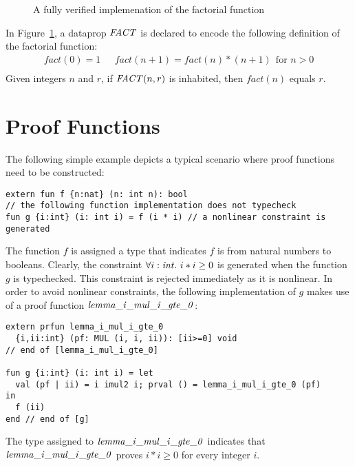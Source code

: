\begin{figure}

\caption{A fully verified implemenation of the factorial function}
\label{figure:factorial_function_proof}
\end{figure}
In Figure~\ref{figure:factorial_function_proof}, a dataprop
${\it FACT}$ is declared to encode the following definition of the factorial
function:
\[\begin{array}{ll}
fact (0) = 1 ~~~& fact (n+1) = fact (n) * (n+1)~~\mbox{for $n>0$} \\
\end{array}\]
Given integers $n$ and $r$, if ${\it FACT}(n,r)$ is inhabited, then
$fact(n)$ equals $r$.

\section{Proof Functions}
The following simple example depicts a typical scenario where
proof functions need to be constructed:
\begin{verbatim}
extern fun f {n:nat} (n: int n): bool
// the following function implementation does not typecheck
fun g {i:int} (i: int i) = f (i * i) // a nonlinear constraint is generated
\end{verbatim}
The function $f$ is assigned a type that indicates $f$ is from natural
numbers to booleans. Clearly, the constraint $\forall{i:{\it int}}.~i*i\geq 0$
is generated when the function $g$ is typechecked. This constraint is
rejected immediately as it is nonlinear. In order to avoid nonlinear
constraints, the following implementation of $g$ makes use of a proof
function ${\it lemma\_i\_mul\_i\_gte\_0}$:
\begin{verbatim}
extern prfun lemma_i_mul_i_gte_0
  {i,ii:int} (pf: MUL (i, i, ii)): [ii>=0] void
// end of [lemma_i_mul_i_gte_0]

fun g {i:int} (i: int i) = let
  val (pf | ii) = i imul2 i; prval () = lemma_i_mul_i_gte_0 (pf)
in
  f (ii)
end // end of [g]
\end{verbatim}
The type assigned to ${\it lemma\_i\_mul\_i\_gte\_0}$ indicates that ${\it
lemma\_i\_mul\_i\_gte\_0}$ proves $i*i\geq 0$ for every integer $i$.

